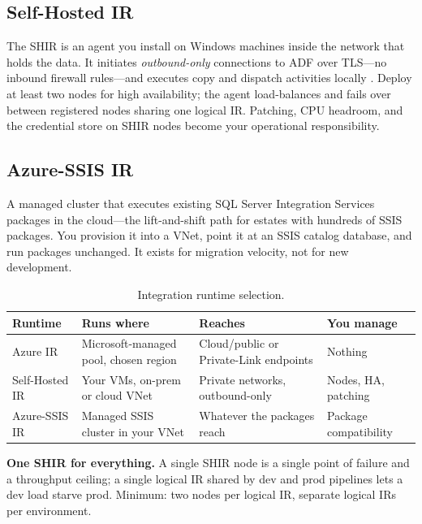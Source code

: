 \subsection{Self-Hosted IR}
The SHIR is an agent you install on Windows machines inside the network that holds the data. It initiates \emph{outbound-only} connections to ADF over TLS---no inbound firewall rules---and executes copy and dispatch activities locally \cite{microsoft2025adfIR}. Deploy at least two nodes for high availability; the agent load-balances and fails over between registered nodes sharing one logical IR. Patching, CPU headroom, and the credential store on SHIR nodes become your operational responsibility.

\subsection{Azure-SSIS IR}
A managed cluster that executes existing SQL Server Integration Services packages in the cloud---the lift-and-shift path for estates with hundreds of SSIS packages. You provision it into a VNet, point it at an SSIS catalog database, and run packages unchanged. It exists for migration velocity, not for new development.

\begin{table}[H]
\centering
\small
\begin{tabular}{@{}p{2.8cm}p{4.2cm}p{4.0cm}p{2.6cm}@{}}
\toprule
\textbf{Runtime} & \textbf{Runs where} & \textbf{Reaches} & \textbf{You manage} \\
\midrule
Azure IR & Microsoft-managed pool, chosen region & Cloud/public or Private-Link endpoints & Nothing \\
Self-Hosted IR & Your VMs, on-prem or cloud VNet & Private networks, outbound-only & Nodes, HA, patching \\
Azure-SSIS IR & Managed SSIS cluster in your VNet & Whatever the packages reach & Package compatibility \\
\bottomrule
\end{tabular}
\caption{Integration runtime selection.}
\label{tab:ch10-ir-selection}
\end{table}

\begin{pitfall}
\textbf{One SHIR for everything.} A single SHIR node is a single point of failure and a throughput ceiling; a single logical IR shared by dev and prod pipelines lets a dev load starve prod. Minimum: two nodes per logical IR, separate logical IRs per environment.
\end{pitfall}

